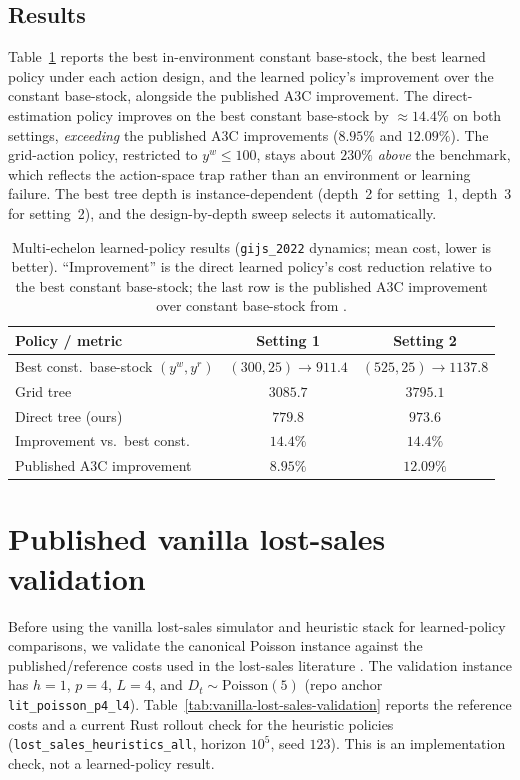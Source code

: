 \documentclass[11pt]{article}
\begin{document}
\subsection{Results}

Table~\ref{tab:me-results} reports the best in-environment constant base-stock, the best learned
policy under each action design, and the learned policy's improvement over the constant base-stock,
alongside the published A3C improvement. The direct-estimation policy improves on the best constant
base-stock by $\approx 14.4\%$ on both settings, \emph{exceeding} the published A3C improvements
($8.95\%$ and $12.09\%$). The grid-action policy, restricted to $y^w\le 100$, stays about $230\%$
\emph{above} the benchmark, which reflects the action-space trap rather than an environment or
learning failure. The best tree depth is instance-dependent (depth~2 for setting~1, depth~3 for
setting~2), and the design-by-depth sweep selects it automatically.

\begin{table}[!htbp]
\centering
\caption{Multi-echelon learned-policy results (\texttt{gijs\_2022} dynamics; mean cost, lower is
better). ``Improvement'' is the direct learned policy's cost reduction relative to the best
constant base-stock; the last row is the published A3C improvement over constant base-stock from
\citet{gijsbrechts2022drl}.}
\label{tab:me-results}
\begin{tabular}{lcc}
\toprule
Policy / metric & Setting 1 & Setting 2 \\
\midrule
Best const.\ base-stock $(y^w,y^r)$ & $(300,25)\to 911.4$ & $(525,25)\to 1137.8$ \\
Grid tree & $3085.7$ & $3795.1$ \\
Direct tree (ours) & $\mathbf{779.8}$ & $\mathbf{973.6}$ \\
Improvement vs.\ best const. & $\mathbf{14.4\%}$ & $\mathbf{14.4\%}$ \\
Published A3C improvement & $8.95\%$ & $12.09\%$ \\
\bottomrule
\end{tabular}
\end{table}
\FloatBarrier

\appendix

\section{Published vanilla lost-sales validation}

Before using the vanilla lost-sales simulator and heuristic stack for learned-policy comparisons, we
validate the canonical Poisson instance against the published/reference costs used in the lost-sales
literature \citep{Zipkin2008OldSystems,Xin2021CappedBaseStock}. The validation instance has
$h=1$, $p=4$, $L=4$, and $D_t\sim\mathrm{Poisson}(5)$ (repo anchor
\texttt{lit\_poisson\_p4\_l4}). Table~\ref{tab:vanilla-lost-sales-validation} reports the reference
costs and a current Rust rollout check for the heuristic policies
(\texttt{lost\_sales\_heuristics\_all}, horizon $10^5$, seed $123$). This is an implementation
check, not a learned-policy result.
\end{document}
